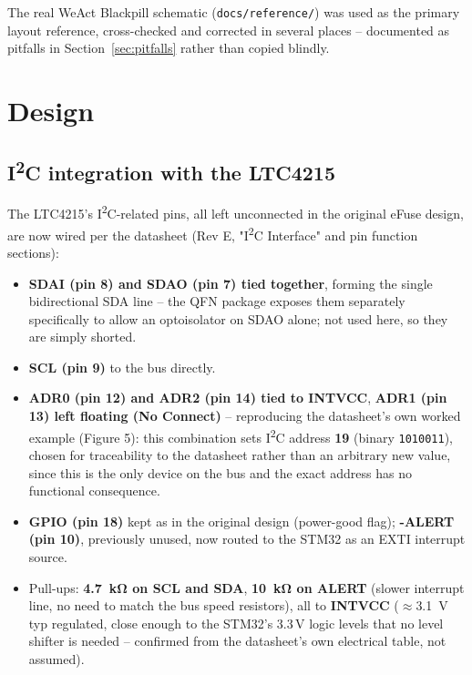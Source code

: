 \documentclass[11pt]{article}
\begin{document}
The real WeAct Blackpill schematic (\texttt{docs/reference/}) was used as the primary layout
reference, cross-checked and corrected in several places -- documented as pitfalls in
Section~\ref{sec:pitfalls} rather than copied blindly.

\section{Design}

\subsection{I\textsuperscript{2}C integration with the LTC4215}
\label{sec:i2c}

The LTC4215's I\textsuperscript{2}C-related pins, all left unconnected in the original eFuse design,
are now wired per the datasheet (Rev E, "I\textsuperscript{2}C Interface" and pin function sections):

\begin{itemize}
\item \textbf{SDAI (pin 8) and SDAO (pin 7) tied together}, forming the single bidirectional SDA line
  -- the QFN package exposes them separately specifically to allow an optoisolator on SDAO alone; not
  used here, so they are simply shorted.
\item \textbf{SCL (pin 9)} to the bus directly.
\item \textbf{ADR0 (pin 12) and ADR2 (pin 14) tied to INTVCC}, \textbf{ADR1 (pin 13) left floating
  (No Connect)} -- reproducing the datasheet's own worked example (Figure 5): this combination sets
  I\textsuperscript{2}C address \textbf{19} (binary \texttt{1010011}), chosen for traceability to the
  datasheet rather than an arbitrary new value, since this is the only device on the bus and the exact
  address has no functional consequence.
\item \textbf{GPIO (pin 18)} kept as in the original design (power-good flag); \textbf{-ALERT (pin
  10)}, previously unused, now routed to the STM32 as an EXTI interrupt source.
\item Pull-ups: \textbf{\SI{4.7}{\kilo\ohm} on SCL and SDA}, \textbf{\SI{10}{\kilo\ohm} on ALERT} (slower interrupt
  line, no need to match the bus speed resistors), all to \textbf{INTVCC} ($\approx$\SI{3.1}{\volt}
  typ regulated, close enough to the STM32's 3.3\,V logic levels that no level shifter is needed --
  confirmed from the datasheet's own electrical table, not assumed).
\end{itemize}
\end{document}
